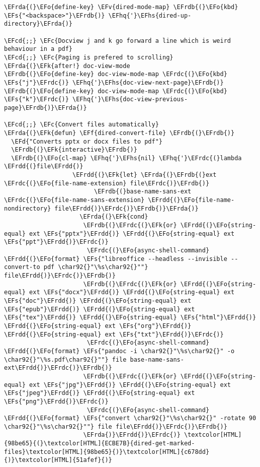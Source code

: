 \documentclass[a4wide,10pt]{article}
\newcommand{\EFc}[1]{\textcolor{EFc}{#1}} %
\newcommand{\EFcd}[1]{\textcolor{EFcd}{#1}} %
\newcommand{\EFs}[1]{\textcolor{EFs}{#1}} %
\newcommand{\EFd}[1]{\textcolor{EFd}{#1}} %
\newcommand{\EFk}[1]{\textcolor{EFk}{#1}} %
\newcommand{\EFf}[1]{\textcolor{EFf}{#1}} %
\newcommand{\EFv}[1]{\textcolor{EFv}{#1}} %
\newcommand{\EFo}[1]{\textcolor{EFo}{#1}} %
\newcommand{\EFhq}[1]{\textcolor{EFhq}{#1}} %
\newcommand{\EFhs}[1]{\textcolor{EFhs}{#1}} %
\newcommand{\EFrda}[1]{\textcolor{EFrda}{#1}} %
\newcommand{\EFrdb}[1]{\textcolor{EFrdb}{#1}} %
\newcommand{\EFrdc}[1]{\textcolor{EFrdc}{#1}} %
\newcommand{\EFrdd}[1]{\textcolor{EFrdd}{#1}} %
\begin{document}
\begin{Code}
\begin{Verbatim}
\EFrda{(}\EFo{define-key} \EFv{dired-mode-map} \EFrdb{(}\EFo{kbd} \EFs{"<backspace>"}\EFrdb{)} \EFhq{'}\EFhs{dired-up-directory}\EFrda{)}

\EFcd{;;} \EFc{Docview j and k go forward a line which is weird behaviour in a pdf}
\EFcd{;;} \EFc{Paging is prefered to scrolling}
\EFrda{(}\EFk{after!} doc-view-mode
\EFrdb{(}\EFo{define-key} doc-view-mode-map \EFrdc{(}\EFo{kbd} \EFs{"j"}\EFrdc{)} \EFhq{'}\EFhs{doc-view-next-page}\EFrdb{)}
\EFrdb{(}\EFo{define-key} doc-view-mode-map \EFrdc{(}\EFo{kbd} \EFs{"k"}\EFrdc{)} \EFhq{'}\EFhs{doc-view-previous-page}\EFrdb{)}\EFrda{)}

\EFcd{;;} \EFc{Convert files automatically}
\EFrda{(}\EFk{defun} \EFf{dired-convert-file} \EFrdb{(}\EFrdb{)}
  \EFd{"Converts pptx or docx files to pdf"}
  \EFrdb{(}\EFk{interactive}\EFrdb{)}
  \EFrdb{(}\EFo{cl-map} \EFhq{'}\EFhs{nil} \EFhq{'}\EFrdc{(}lambda \EFrdd{(}file\EFrdd{)}
                   \EFrdd{(}\EFk{let} \EFrda{(}\EFrdb{(}ext \EFrdc{(}\EFo{file-name-extension} file\EFrdc{)}\EFrdb{)}
                         \EFrdb{(}base-name-sans-ext \EFrdc{(}\EFo{file-name-sans-extension} \EFrdd{(}\EFo{file-name-nondirectory} file\EFrdd{)}\EFrdc{)}\EFrdb{)}\EFrda{)}
                     \EFrda{(}\EFk{cond}
                      \EFrdb{(}\EFrdc{(}\EFk{or} \EFrdd{(}\EFo{string-equal} ext \EFs{"pptx"}\EFrdd{)} \EFrdd{(}\EFo{string-equal} ext \EFs{"ppt"}\EFrdd{)}\EFrdc{)}
                       \EFrdc{(}\EFo{async-shell-command} \EFrdd{(}\EFo{format} \EFs{"libreoffice --headless --invisible --convert-to pdf \char92{}"\%s\char92{}""} file\EFrdd{)}\EFrdc{)}\EFrdb{)}
                      \EFrdb{(}\EFrdc{(}\EFk{or} \EFrdd{(}\EFo{string-equal} ext \EFs{"docx"}\EFrdd{)} \EFrdd{(}\EFo{string-equal} ext \EFs{"doc"}\EFrdd{)} \EFrdd{(}\EFo{string-equal} ext \EFs{"epub"}\EFrdd{)} \EFrdd{(}\EFo{string-equal} ext \EFs{"tex"}\EFrdd{)} \EFrdd{(}\EFo{string-equal} \EFs{"html"}\EFrdd{)} \EFrdd{(}\EFo{string-equal} ext \EFs{"org"}\EFrdd{)} \EFrdd{(}\EFo{string-equal} ext \EFs{"txt"}\EFrdd{)}\EFrdc{)}
                       \EFrdc{(}\EFo{async-shell-command} \EFrdd{(}\EFo{format} \EFs{"pandoc -i \char92{}"\%s\char92{}" -o \char92{}"\%s.pdf\char92{}""} file base-name-sans-ext\EFrdd{)}\EFrdc{)}\EFrdb{)}
                      \EFrdb{(}\EFrdc{(}\EFk{or} \EFrdd{(}\EFo{string-equal} ext \EFs{"jpg"}\EFrdd{)} \EFrdd{(}\EFo{string-equal} ext \EFs{"jpeg"}\EFrdd{)} \EFrdd{(}\EFo{string-equal} ext \EFs{"png"}\EFrdd{)}\EFrdc{)}
                       \EFrdc{(}\EFo{async-shell-command} \EFrdd{(}\EFo{format} \EFs{"convert \char92{}"\%s\char92{}" -rotate 90 \char92{}"\%s\char92{}""} file file\EFrdd{)}\EFrdc{)}\EFrdb{)}
                      \EFrda{)}\EFrdd{)}\EFrdc{)} \textcolor[HTML]{98be65}{(}\textcolor[HTML]{ECBE7B}{dired-get-marked-files}\textcolor[HTML]{98be65}{)}\textcolor[HTML]{c678dd}{)}\textcolor[HTML]{51afef}{)}


\end{Verbatim}
\end{Code}
\end{document}
